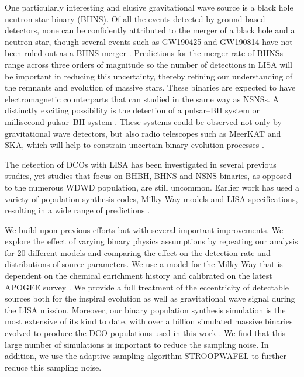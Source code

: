 One particularly interesting and elusive gravitational wave source is a black hole neutron star binary (BHNS). Of all the events detected by ground-based detectors, none can be confidently attributed to the merger of a black hole and a neutron star, though several events such as GW190425 and GW190814 have not been ruled out as a BHNS merger \citep{Abbott+2020_GW190425,Abbott+2020_GW190814}. Predictions for the merger rate of BHNSs range across three orders of magnitude \citep[e.g.][]{Abadie+2010, Broekgaarden+2021} so the number of detections in LISA will be important in reducing this uncertainty, thereby refining our understanding of the remnants and evolution of massive stars. These binaries are expected to have electromagnetic counterparts that can studied in the same way as NSNSs. A distinctly exciting possibility is the detection of a pulsar--BH system or millisecond pulsar--BH system \citep{Narayan+1991}. These systems could be observed not only by gravitational wave detectors, but also radio telescopes such as MeerKAT and SKA, which will help to constrain uncertain binary evolution processes \citep[e.g.][]{Pfahl+2005,Chattopadhyay+2020}.

The detection of DCOs with LISA has been investigated in several previous studies, yet studies that focus on BHBH, BHNS and NSNS binaries, as opposed to the numerous WDWD population, are still uncommon. Earlier work has used a variety of population synthesis codes, Milky Way models and LISA specifications, resulting in a wide range of predictions \citep{Nelemans+2001,Liu+2009,Belczynski+2010,Liu+2014,Lamberts+2019,Lau+2020,Breivik+2020,Sesana+2020}.

We build upon previous efforts but with several important improvements. We explore the effect of varying binary physics assumptions by repeating our analysis for 20 different models and comparing the effect on the detection rate and distributions of source parameters. We use a model for the Milky Way that is dependent on the chemical enrichment history and calibrated on the latest APOGEE survey \citep{Majewski+2017,Frankel+2018}. We provide a full treatment of the eccentricity of detectable sources both for the inspiral evolution as well as gravitational wave signal during the LISA mission. Moreover, our binary population synthesis simulation is the most extensive of its kind to date, with over a billion simulated massive binaries evolved to produce the DCO populations used in this work \citep{Broekgaarden+2021}. We find that this large number of simulations is important to reduce the sampling noise. In addition, we use the adaptive sampling algorithm STROOPWAFEL \citep{Broekgaarden+2019} to further reduce this sampling noise.

